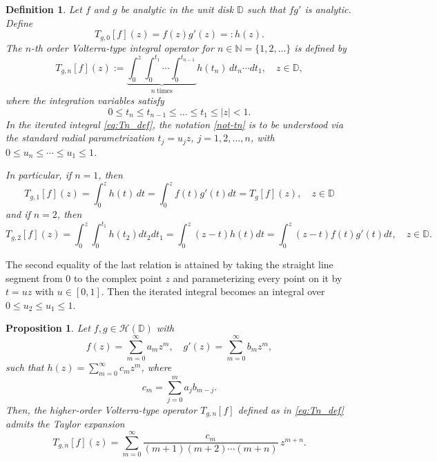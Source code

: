 \documentclass[12pt,a4paper]{amsart}
\numberwithin{equation}{section}
\newtheorem{definition}{Definition}[section]
\newtheorem{proposition}{Proposition}[section]
\theoremstyle{remark}
\begin{document}
\begin{definition}\rm
Let $f$ and $g$ be analytic in the unit disk $\mathbb{D}$ such that $fg'$ is analytic.  
Define
\begin{equation*}
T_{g,0}[f](z)=f(z)g'(z)=:h(z).
\end{equation*}
The $n$-th order Volterra-type integral operator for $n\in\mathbb{N}=\{1,2,\ldots\}$ is defined by
\begin{equation}\label{eq:Tn_def}
T_{g,n}[f](z)
:=\underbrace{\int_0^z\int_0^{t_1}\cdots\int_0^{t_{n-1}}}_{n\ \text{times}} h(t_n)\,dt_n\cdots dt_1,
\quad z\in\mathbb{D},
\end{equation}
where the integration variables satisfy
\begin{equation}\label{not-tn}
0 \le t_n \le t_{n-1} \le \dots \le t_1 \le |z| < 1.
\end{equation}
In the iterated integral \eqref{eq:Tn_def}, the notation \eqref{not-tn} is to be understood via the standard radial parametrization \(t_j=u_j z\), $j=1,2,\ldots,n$, with \(0\le u_n\le\cdots\le u_1\le1\). 

In particular, if $n=1$, then
\begin{equation*}
  T_{g,1}[f](z)=\int_0^z h(t)\,dt=\int_0^z f(t)g'(t)dt=T_g [f](z),\quad z\in \mathbb D
\end{equation*}
and if $n=2$, then
\begin{equation*}
  T_{g,2}[f](z)=\int_0^z\int_0^{t_1} h(t_2) dt_2 dt_1
  =\int_0^z (z-t)h(t)dt=\int_0^z (z-t)f(t)g'(t)dt,\quad z\in \mathbb D.
\end{equation*}
\end{definition}



The second equality of the last relation is attained by taking the straight line segment from $0$ to the complex point $z$ and parameterizing every point on it by $t=uz$ with
$u\in[0,1]$. Then the iterated integral becomes an integral over $0\leq u_2\leq u_1\leq 1$.
\begin{proposition}\label{prop:Taylor-Tgn}
Let \(f,g\in\mathcal{H}(\mathbb{D})\) with
\[
f(z)=\sum_{m=0}^{\infty} a_m z^m, 
\quad 
g'(z)=\sum_{m=0}^{\infty} b_m z^m,
\]
such that \(h(z)=\sum_{m=0}^{\infty} c_m z^m\), where
\[
c_m=\sum_{j=0}^{m} a_j b_{m-j}.
\]
Then, the higher-order Volterra-type operator \(T_{g,n}[f]\) defined as in \eqref{eq:Tn_def} admits the Taylor expansion
\begin{equation*}\label{eq:Tgn-series}
T_{g,n}[f](z)
= \sum_{m=0}^{\infty} \frac{c_m}{(m+1)(m+2)\cdots(m+n)}\,z^{m+n}.
\end{equation*}
\end{proposition}
\end{document}
